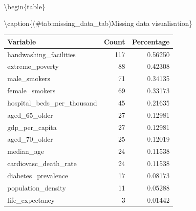 \documentclass[
]{article}
\newenvironment{Shaded}{\begin{snugshade}}{\end{snugshade}}
\newcommand{\CommentTok}[1]{\textcolor[rgb]{0.56,0.35,0.01}{\textit{#1}}}
\newcommand{\DataTypeTok}[1]{\textcolor[rgb]{0.13,0.29,0.53}{#1}}
\newcommand{\DecValTok}[1]{\textcolor[rgb]{0.00,0.00,0.81}{#1}}
\newcommand{\KeywordTok}[1]{\textcolor[rgb]{0.13,0.29,0.53}{\textbf{#1}}}
\newcommand{\NormalTok}[1]{#1}
\newcommand{\OperatorTok}[1]{\textcolor[rgb]{0.81,0.36,0.00}{\textbf{#1}}}
\newcommand{\StringTok}[1]{\textcolor[rgb]{0.31,0.60,0.02}{#1}}
\begin{document}
\begin{Shaded}
\end{Shaded}

\textbackslash begin\{table\}

\textbackslash caption\{(\#tab:missing\_data\_tab)Missing data visualisation\}
\centering
\fontsize{7}{9}\selectfont

\begin{tabular}[t]{|>{}l|r|>{}r|}
\hline
Variable & Count & Percentage\\
\hline
handwashing\_facilities & 117 & 0.56250\\
\hline
extreme\_poverty & 88 & 0.42308\\
\hline
male\_smokers & 71 & 0.34135\\
\hline
female\_smokers & 69 & 0.33173\\
\hline
hospital\_beds\_per\_thousand & 45 & 0.21635\\
\hline
aged\_65\_older & 27 & 0.12981\\
\hline
gdp\_per\_capita & 27 & 0.12981\\
\hline
aged\_70\_older & 25 & 0.12019\\
\hline
median\_age & 24 & 0.11538\\
\hline
cardiovasc\_death\_rate & 24 & 0.11538\\
\hline
diabetes\_prevalence & 17 & 0.08173\\
\hline
population\_density & 11 & 0.05288\\
\hline
life\_expectancy & 3 & 0.01442\\
\hline
\end{tabular}
\end{document}
